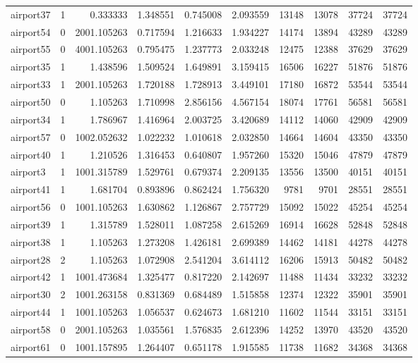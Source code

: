 \begin{longtable}{|l|r|r|r|r|r|r|r|r|r|}
airport37 & 1 & 0.333333 & 1.348551 & 0.745008 & 2.093559 & 13148 & 13078 & 37724 & 37724 \\
airport54 & 0 & 2001.105263 & 0.717594 & 1.216633 & 1.934227 & 14174 & 13894 & 43289 & 43289 \\
airport55 & 0 & 4001.105263 & 0.795475 & 1.237773 & 2.033248 & 12475 & 12388 & 37629 & 37629 \\
airport35 & 1 & 1.438596 & 1.509524 & 1.649891 & 3.159415 & 16506 & 16227 & 51876 & 51876 \\
airport33 & 1 & 2001.105263 & 1.720188 & 1.728913 & 3.449101 & 17180 & 16872 & 53544 & 53544 \\
airport50 & 0 & 1.105263 & 1.710998 & 2.856156 & 4.567154 & 18074 & 17761 & 56581 & 56581 \\
airport34 & 1 & 1.786967 & 1.416964 & 2.003725 & 3.420689 & 14112 & 14060 & 42909 & 42909 \\
airport57 & 0 & 1002.052632 & 1.022232 & 1.010618 & 2.032850 & 14664 & 14604 & 43350 & 43350 \\
airport40 & 1 & 1.210526 & 1.316453 & 0.640807 & 1.957260 & 15320 & 15046 & 47879 & 47879 \\
airport3 & 1 & 1001.315789 & 1.529761 & 0.679374 & 2.209135 & 13556 & 13500 & 40151 & 40151 \\
airport41 & 1 & 1.681704 & 0.893896 & 0.862424 & 1.756320 & 9781 & 9701 & 28551 & 28551 \\
airport56 & 0 & 1001.105263 & 1.630862 & 1.126867 & 2.757729 & 15092 & 15022 & 45254 & 45254 \\
airport39 & 1 & 1.315789 & 1.528011 & 1.087258 & 2.615269 & 16914 & 16628 & 52848 & 52848 \\
airport38 & 1 & 1.105263 & 1.273208 & 1.426181 & 2.699389 & 14462 & 14181 & 44278 & 44278 \\
airport28 & 2 & 1.105263 & 1.072908 & 2.541204 & 3.614112 & 16206 & 15913 & 50482 & 50482 \\
airport42 & 1 & 1001.473684 & 1.325477 & 0.817220 & 2.142697 & 11488 & 11434 & 33232 & 33232 \\
airport30 & 2 & 1001.263158 & 0.831369 & 0.684489 & 1.515858 & 12374 & 12322 & 35901 & 35901 \\
airport44 & 1 & 1001.105263 & 1.056537 & 0.624673 & 1.681210 & 11602 & 11544 & 33151 & 33151 \\
airport58 & 0 & 2001.105263 & 1.035561 & 1.576835 & 2.612396 & 14252 & 13970 & 43520 & 43520 \\
airport61 & 0 & 1001.157895 & 1.264407 & 0.651178 & 1.915585 & 11738 & 11682 & 34368 & 34368 \\

\end{longtable}
